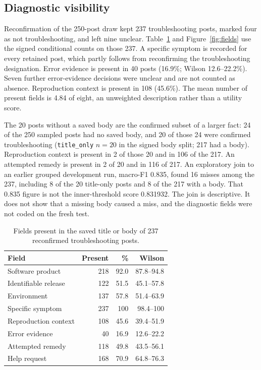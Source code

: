 \documentclass[conference,letterpaper]{IEEEtran}
\begin{document}
\subsection{Diagnostic visibility}
Reconfirmation of the 250-post draw kept 237 troubleshooting posts, marked four as not troubleshooting, and left nine unclear. Table~\ref{tab:fields} and Figure~\ref{fig:fields} use the signed conditional counts on those 237. A specific symptom is recorded for every retained post, which partly follows from reconfirming the troubleshooting designation. Error evidence is present in 40 posts (16.9\%; Wilson 12.6--22.2\%). Seven further error-evidence decisions were unclear and are not counted as absence. Reproduction context is present in 108 (45.6\%). The mean number of present fields is 4.84 of eight, an unweighted description rather than a utility score.

The 20 posts without a saved body are the confirmed subset of a larger fact: 24 of the 250 sampled posts had no saved body, and 20 of those 24 were confirmed troubleshooting (\texttt{title\_only} $n=20$ in the signed body split; 217 had a body). Reproduction context is present in 2 of those 20 and in 106 of the 217. An attempted remedy is present in 2 of 20 and in 116 of 217. An exploratory join to an earlier grouped development run, macro-F1 0.835, found 16 misses among the 237, including 8 of the 20 title-only posts and 8 of the 217 with a body. That 0.835 figure is not the inner-threshold score 0.831932. The join is descriptive. It does not show that a missing body caused a miss, and the diagnostic fields were not coded on the fresh test.

\begin{table}[t]
\caption{Fields present in the saved title or body of 237 reconfirmed troubleshooting posts.}
\label{tab:fields}
\centering
\footnotesize
\setlength{\tabcolsep}{3pt}
\begin{tabular}{lrrr}
\toprule
Field & Present & \% & Wilson \\
\midrule
Software product & 218 & 92.0 & 87.8--94.8 \\
Identifiable release & 122 & 51.5 & 45.1--57.8 \\
Environment & 137 & 57.8 & 51.4--63.9 \\
Specific symptom & 237 & 100 & 98.4--100 \\
Reproduction context & 108 & 45.6 & 39.4--51.9 \\
Error evidence & 40 & 16.9 & 12.6--22.2 \\
Attempted remedy & 118 & 49.8 & 43.5--56.1 \\
Help request & 168 & 70.9 & 64.8--76.3 \\
\bottomrule
\end{tabular}
\end{table}
\end{document}
